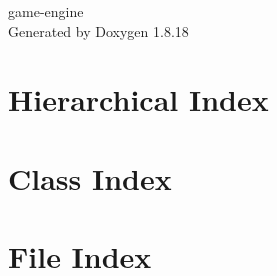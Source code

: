 \let\mypdfximage\pdfximage\def\pdfximage{\immediate\mypdfximage}\documentclass[twoside]{book}
\newcommand{\+}{\discretionary{\mbox{\scriptsize$\hookleftarrow$}}{}{}}
\newcommand{\clearemptydoublepage}{%
  \newpage{\pagestyle{empty}\cleardoublepage}%
}
\begin{document}
\hypersetup{pageanchor=false,
             bookmarksnumbered=true,
             pdfencoding=unicode
            }
\begin{titlepage}
\vspace*{7cm}
\begin{center}%
{\Large game-\/engine }\\
\vspace*{1cm}
{\large Generated by Doxygen 1.8.18}\\
\end{center}
\end{titlepage}
\clearemptydoublepage
{}
\tableofcontents
\clearemptydoublepage
{}
\hypersetup{pageanchor=true}

\chapter{Hierarchical Index}

\chapter{Class Index}

\chapter{File Index}

\end{document}
